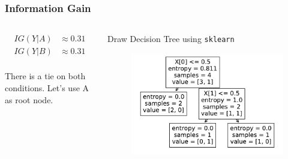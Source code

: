 \documentclass[aspectratio=169, 10pt]{beamer}
\begin{document}
\begin{frame}
    \frametitle{Information Gain}
    \small
    
    \begin{columns}
        \begin{column}{0.5\textwidth}
            \[
                \begin{split}
                    IG(Y | A) & \approx 0.31\\
                    IG(Y | B) & \approx 0.31\\
                \end{split}
            \]
            
            There is a tie on both conditions. Let's use A as root node.
        \end{column}
        \begin{column}{0.5\textwidth}
            Draw Decision Tree using \texttt{sklearn}
            \begin{figure}
                \centering
                \includegraphics[width=\columnwidth]{../plots/tree_logic_01.pdf}
            \end{figure}
        \end{column}
    \end{columns}

\end{frame}
\end{document}
